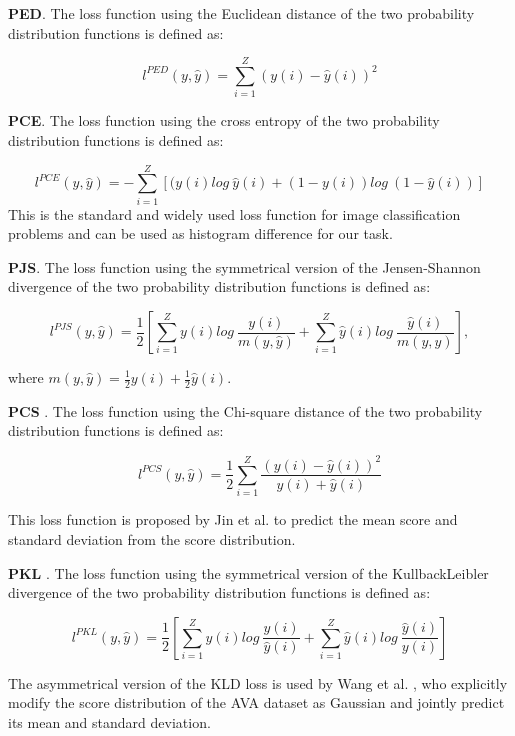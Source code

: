 \documentclass[letterpaper]{article} %
\begin{document}
\textbf{PED}. The loss function using the Euclidean distance of the two probability distribution functions is defined as:

\begin{equation}
l^{PED}(y,\hat{y}) = \sum_{i=1}^{Z}(y(i)-\hat{y}(i))^2
\label{eq:PED}
\end{equation}

\textbf{PCE}. The loss function using the cross entropy of the two probability distribution functions is defined as:

\begin{equation}
l^{PCE}(y,\hat{y}) = -\sum_{i=1}^{Z}[(y(i)log~\hat{y}(i)+(1-y(i))log~(1-\hat{y}(i))]
\label{eq:PCE}
\end{equation}
This is the standard and widely used loss function for image classification problems and can be used as histogram difference for our task.

\textbf{PJS}. The loss function using the symmetrical version of the Jensen-Shannon divergence of the two probability distribution functions is defined as:


\begin{small}
\begin{equation}
l^{PJS}(y,\hat{y}) = 
\frac{1}{2}
[
\sum_{i=1}^{Z}y(i)log~\frac{y(i)}{m(y,\hat{y})} 
+ 
\sum_{i=1}^{Z}\hat{y}(i)log~\frac{\hat{y}(i)}{m(y,\hat{y})}
],
\label{eq:PJS}
\end{equation}
\end{small}
where $m(y,\hat{y}) = \frac{1}{2}y(i)+\frac{1}{2}\hat{y}(i)$.


\textbf{PCS} \cite{JinICIP2016}. The loss function using the Chi-square distance of the two probability distribution functions is defined as:


\begin{small}
\begin{equation}
l^{PCS}(y,\hat{y}) = 
\frac{1}{2}
\sum_{i=1}^{Z}\frac{(y(i)-\hat{y}(i))^2}{y(i)+\hat{y}(i)}
\label{eq:PCS}
\end{equation}
\end{small}
This loss function is proposed by Jin et al. \cite{JinICIP2016} to predict the mean score and standard deviation from the score distribution.


\textbf{PKL} \cite{WangIJCNN2017}. The loss function using the symmetrical version of the KullbackLeibler divergence of the two probability distribution functions is defined as:


\begin{small}
\begin{equation}
l^{PKL}(y,\hat{y}) = 
\frac{1}{2}
[
\sum_{i=1}^{Z}y(i)log~\frac{y(i)}{\hat{y}(i)} 
+ 
\sum_{i=1}^{Z}\hat{y}(i)log~\frac{\hat{y}(i)}{y(i)}
]
\label{eq:PKL}
\end{equation}
\end{small}
The asymmetrical version of the KLD loss is used by Wang et al. \cite{WangIJCNN2017}, who 
explicitly modify the score distribution of the AVA dataset as Gaussian and jointly predict its mean and standard deviation.
\end{document}
